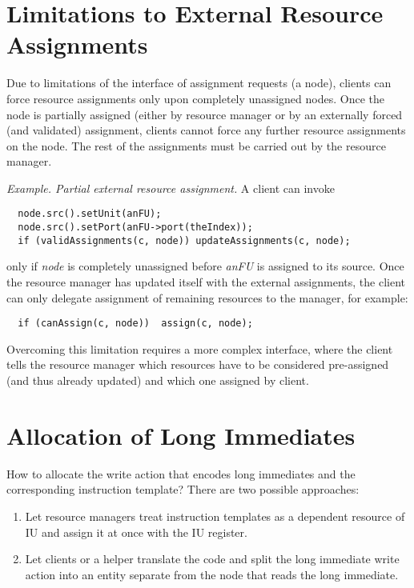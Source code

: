 \documentclass[a4paper,twoside]{tce}
\begin{document}
\section{Limitations to External Resource Assignments}
\label{ch:pending:ext-assignment}

Due to limitations of the interface of assignment requests (a node), clients
can force resource assignments only upon completely unassigned nodes. Once
the node is partially assigned (either by resource manager or by an
externally forced (and validated) assignment, clients cannot force any
further resource assignments on the node. The rest of the assignments must
be carried out by the resource manager.

\emph{Example. Partial external resource assignment.}
A client can invoke
\begin{verbatim}
  node.src().setUnit(anFU);
  node.src().setPort(anFU->port(theIndex));
  if (validAssignments(c, node)) updateAssignments(c, node);
\end{verbatim}
only if \emph{node} is completely unassigned before \emph{anFU} is assigned
to its source. Once the resource manager has updated itself with the
external assignments, the client can only delegate assignment of remaining
resources to the manager, for example:
\begin{verbatim}
  if (canAssign(c, node))  assign(c, node);
\end{verbatim}

Overcoming this limitation requires a more complex interface, where the
client tells the resource manager which resources have to be considered
pre-assigned (and thus already updated) and which one assigned by client.

\section{Allocation of Long Immediates}
\label{ch:pending:long-immediates}

How to allocate the write action that encodes long immediates and the
corresponding instruction template? There are two possible approaches:
\begin{enumerate}
\item %
  Let resource managers treat instruction templates as a dependent resource
  of IU and assign it at once with the IU register.
\item %
  Let clients or a helper translate the code and split the long immediate
  write action into an entity separate from the node that reads the long
  immediate.
\end{enumerate}
\end{document}
